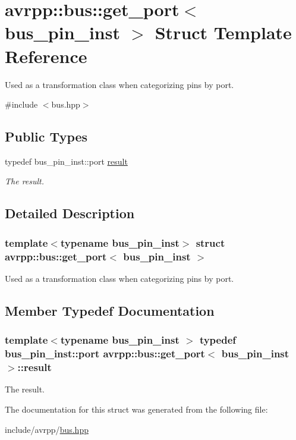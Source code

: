 \hypertarget{structavrpp_1_1bus_1_1get__port}{
\section{avrpp::bus::get\_\-port$<$ bus\_\-pin\_\-inst $>$ Struct Template Reference}
\label{structavrpp_1_1bus_1_1get__port}
}


Used as a transformation class when categorizing pins by port.  




{\ttfamily \#include $<$bus.hpp$>$}

\subsection*{Public Types}
\begin{DoxyCompactItemize}
\item 
typedef bus\_\-pin\_\-inst::port \hyperlink{structavrpp_1_1bus_1_1get__port_ab604df6277d113437c1601e6704571ea}{result}
\begin{DoxyCompactList}\small\item\em The result. \item\end{DoxyCompactList}\end{DoxyCompactItemize}


\subsection{Detailed Description}
\subsubsection*{template$<$typename bus\_\-pin\_\-inst$>$ struct avrpp::bus::get\_\-port$<$ bus\_\-pin\_\-inst $>$}

Used as a transformation class when categorizing pins by port. 

\subsection{Member Typedef Documentation}
\hypertarget{structavrpp_1_1bus_1_1get__port_ab604df6277d113437c1601e6704571ea}{
\subsubsection[{result}]{\setlength{\rightskip}{0pt plus 5cm}template$<$typename bus\_\-pin\_\-inst $>$ typedef bus\_\-pin\_\-inst::port {\bf avrpp::bus::get\_\-port}$<$ bus\_\-pin\_\-inst $>$::{\bf result}}}
\label{structavrpp_1_1bus_1_1get__port_ab604df6277d113437c1601e6704571ea}


The result. 



The documentation for this struct was generated from the following file:\begin{DoxyCompactItemize}
\item 
include/avrpp/\hyperlink{bus_8hpp}{bus.hpp}\end{DoxyCompactItemize}
